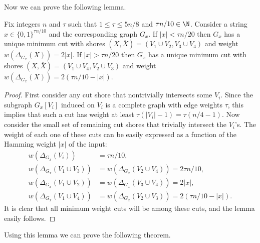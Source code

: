 \noindent
Now we can prove the following lemma.
\begin{lemma} \label{lem:adj-min-cut}
Fix integers $n$ and $\tau$ such that $1 \le \tau \le 5n/8$ and $\tau n/10 \in \N$.
Consider a string $x \in \{0,1\}^{\tau n/10}$ and the corresponding graph $G_x$.
If $|x| < \tau n/20$ then $G_x$ has a unique minimum cut with shores $(X,\overline X) = (V_1 \cup V_2, V_3 \cup V_4)$ and weight $w(\Delta_{G_x}(X)) = 2|x|$.
If $|x| > \tau n/20$ then $G_x$ has a unique minimum cut with shores $(X,\overline X) = (V_1 \cup V_4, V_2 \cup V_3)$ and weight $w(\Delta_{G_x}(X)) = 2(\tau n/10 - |x|)$.
\end{lemma}
\begin{proof}
First consider any cut shore that nontrivially intersects some $V_i$.
Since the subgraph $G_x[V_i]$ induced on $V_i$ is a complete graph with edge weights $\tau$, this implies that such a cut has weight at least $\tau (|V_i|-1) = \tau (n/4-1)$.
Now consider the small set of remaining cut shores that trivially intersect the $V_i$'s.
The weight of each one of these cuts can be easily expressed as a function of the Hamming weight $|x|$ of the input:
\begin{align*}
w(\Delta_{G_x}(V_i))
&= \tau n/10, \\
w(\Delta_{G_x}(V_1 \cup V_3)) &= w(\Delta_{G_x}(V_2 \cup V_4))
= 2 \tau n/10, \\
w(\Delta_{G_x}(V_1 \cup V_2)) &= w(\Delta_{G_x}(V_3 \cup V_4))
= 2 |x|, \\
w(\Delta_{G_x}(V_1 \cup V_4)) &= w(\Delta_{G_x}(V_2 \cup V_3))
= 2 (\tau n/10- |x|).
\end{align*}
It is clear that all minimum weight cuts will be among these cuts, and the lemma easily follows.
\end{proof}

Using this lemma we can prove the following theorem.

